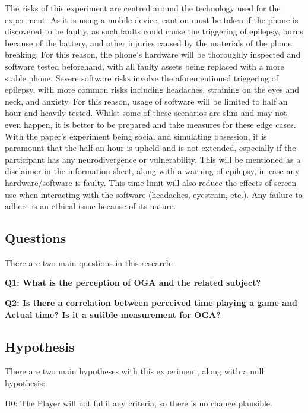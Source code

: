 \documentclass[conference]{IEEEtran}
\begin{document}
 The risks of this experiment are centred around the technology used for the experiment. As it is using a mobile device, caution must be taken if the phone is discovered to be faulty, as such faults could cause the triggering of epilepsy, burns because of the battery, and other injuries caused by the materials of the phone breaking. For this reason, the phone’s hardware will be thoroughly inspected and software tested beforehand, with all faulty assets being replaced with a more stable phone. Severe software risks involve the aforementioned triggering of epilepsy, with more common risks including headaches, straining on the eyes and neck, and anxiety. For this reason, usage of software will be limited to half an hour and heavily tested. Whilst some of these scenarios are slim and may not even happen, it is better to be prepared and take measures for these edge cases.\\

With the paper’s experiment being social and simulating obsession, it is paramount that the half an hour is upheld and is not extended, especially if the participant has any neurodivergence or vulnerability. This will be mentioned as a disclaimer in the information sheet, along with a warning of epilepsy, in case any hardware/software is faulty. This time limit will also reduce the effects of screen use when interacting with the software (headaches, eyestrain, etc.). Any failure to adhere is an ethical issue because of its nature. \\
\subsection{Questions}
There are two main questions in this research:

 \textbf{Q1: What is the perception of OGA and the related subject?}

 \textbf{Q2: Is there a correlation between perceived time playing a game and Actual time? Is it a sutible measurement for OGA?}\\

\subsection{Hypothesis}
There are two main hypotheses with this experiment, along with a null hypothesis:

H0: The Player will not fulfil any criteria, so there is no change plausible.\\
\end{document}
